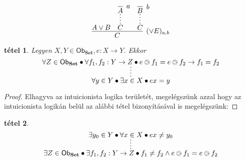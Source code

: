 \documentclass{article}
\newcommand{\obSet}{\ob_{\setCat}}
\newcommand{\ob}{\mathsf{Ob}}
\newcommand{\setCat}{\mathbf{Set}}
\newtheorem{thm}{tétel}
\begin{document}
	\[
		\infer[(\lor E)_{a,b}]{C}{
			A\lor B&
			\infer*C{
				\infer[a]A{}
			}&
			\infer*C{
				\infer[b]B{}
			}
		}
	\]
	\begin{thm}
		Legyen $X, Y \in \obSet, e: X \to Y$. Ekkor
		\[
			\infer*{
				\forall y \in Y \bullet \exists x \in X \bullet ex = y
			}
			{
				\forall Z \in \obSet \bullet \forall f_1, f_2: Y \to Z \bullet e\ogreaterthan f_1 = e\ogreaterthan f_2 \to f_1 = f_2
			}
		\]
	\end{thm}
	\begin{proof}
		Elhagyva az intuicionista logika területét, megelégszünk azzal hogy az intuicionista logikán belül az alábbi tétel bizonyításával is megelégszünk:
	\end{proof}
	\begin{thm}
		\[
			\infer*{
				\exists Z \in \obSet \bullet \exists f_1, f_2: Y \to Z \bullet f_1 \neq f_2 \land e\ogreaterthan f_1 = e\ogreaterthan f_2
			}
			{
				\exists y_0 \in Y \bullet \forall x \in X \bullet ex \neq y_0
			}
		\]
	\end{thm}
\end{document}
